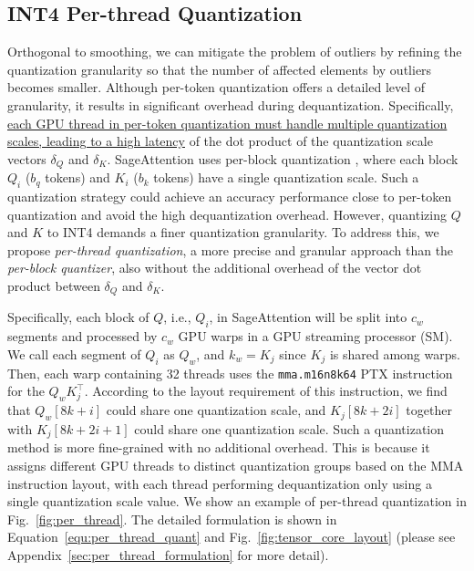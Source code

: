 \subsection{INT4 Per-thread Quantization} \label{sec:per-warp_quant}
Orthogonal to smoothing, we can mitigate the problem of outliers by refining the quantization granularity so that the number of affected elements by outliers becomes smaller. 
Although per-token quantization offers a detailed level of granularity, it results in significant overhead during dequantization. Specifically, \uline{each GPU thread in per-token quantization must handle multiple quantization scales, leading to a high latency} of the dot product of the quantization scale vectors $\delta_Q$ and $\delta_K$.
SageAttention uses per-block quantization%
, where each block $Q_i$ ($b_q$ tokens) and $K_i$ ($b_k$ tokens) have a single quantization scale.
Such a quantization strategy could achieve an accuracy performance close to per-token quantization and avoid the high dequantization overhead. However, quantizing $Q$ and $K$ to INT4 demands a finer quantization granularity. To address this, we propose \textit{per-thread quantization}, a more precise and granular approach than the \textit{per-block quantizer}, also without the additional overhead of the vector dot product between $\delta_Q$ and $\delta_K$. 

Specifically, each block of $Q$, i.e., $Q_i$, in SageAttention will be split into $c_w$ segments and processed by $c_w$ GPU warps in a GPU streaming processor (SM). We call each segment of $Q_i$ as $Q_w$, and $k_w = K_j$ since $K_j$ is shared among warps. Then, each warp containing 32 threads uses the \texttt{mma.m16n8k64} PTX instruction~\cite{ptx} for the $Q_wK_j^\top$. According to the layout requirement of this instruction, we find that $Q_w[8k+i]$ could share one quantization scale, and $K_j[8k+2i]$ together with $K_j[8k+2i+1]$ could share one quantization scale. Such a quantization method is more fine-grained with no additional overhead. This is because it assigns different GPU threads to distinct quantization groups based on the MMA instruction layout, with each thread performing dequantization only using a single quantization scale value. 
We show an example of per-thread quantization in Fig.~\ref{fig:per_thread}. The detailed formulation is shown in Equation~\ref{equ:per_thread_quant} and Fig.~\ref{fig:tensor_core_layout} (please see Appendix~\ref{sec:per_thread_formulation} for more detail). 

